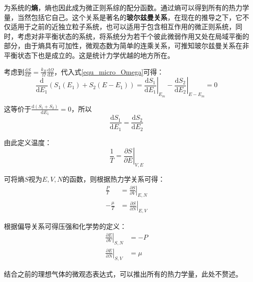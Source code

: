 \documentclass[UTF8]{ctexart}
\newcommand{\dif}{\mathrm{d}}
\begin{document}
	为系统的\textbf{熵}，熵也因此成为微正则系综的配分函数。通过熵可以得到所有的热力学量，当然包括它自己。这个关系是著名的\textbf{玻尔兹曼关系}，在现在的推导之下，它不仅适用于之前的近独立粒子系统，也可以适用于包含相互作用的微正则系统，同时，考虑对非平衡状态的系统，将系统分为若干个彼此微弱作用又处在局域平衡的部分，由于熵具有可加性，微观态数为简单的连乘关系，可推知玻尔兹曼关系在非平衡状态下也是成立的。这是统计力学优越的地方所在。
	
	考虑到$ \frac{\dif S}{\dif E} =\frac{k_{B}}{\Omega} \frac{\dif \Omega}{\dif E} $，代入式\ref{equ_micro_Omega}可得：
	\begin{equation}
	\frac{\mathrm{d}}{\mathrm{d} E_{1}}\left(S_{1}\left(E_{1}\right)+S_{2}\left(E-E_{1}\right)\right)=\left.\frac{\mathrm{d} S_{1}}{\mathrm{d} E_{1}}\right|_{E_{m}}-\left.\frac{\mathrm{d} S_{2}}{\mathrm{d} E_{2}}\right|_{E-E_{m}}=0
	\end{equation}
	
	
\noindent 这等价于$ \frac{\dif \left(S_{1}+S_{2}\right)}{\dif E_{1}}=0 $，所以
\begin{equation}
\frac{\mathrm{d} S_{1}}{\mathrm{d} E_{1}}=\frac{\mathrm{d} S_{2}}{\mathrm{d} E_{2}}
\end{equation}

\noindent 由此定义温度：
\begin{equation}
	\left.\frac{1}{T}=\frac{\partial S}{\partial E}\right|_{V,E}
\end{equation}

	可将熵$ S $视为$ E,V,N $的函数，则根据热力学关系可得：
	\begin{equation}
	\begin{aligned}
	\frac{P}{T}&=\left.\frac{\partial S}{\partial V}\right|_{E, N}\\
	-\frac{\mu}{T}&=\left.\frac{\partial S}{\partial N}\right|_{E, V}
	\end{aligned}
	\end{equation}
	
	根据偏导关系可得压强和化学势的定义：
	\begin{equation}
	\begin{aligned}
		\left.\frac{\partial E}{\partial V}\right|_{S, N}&=-P\\
		\left.\frac{\partial E}{\partial N}\right|_{S, V}&=\mu
	\end{aligned}
	\end{equation}
	
	结合之前的理想气体的微观态表达式，可以推出所有的热力学量，此处不赘述。
	
\end{document}
